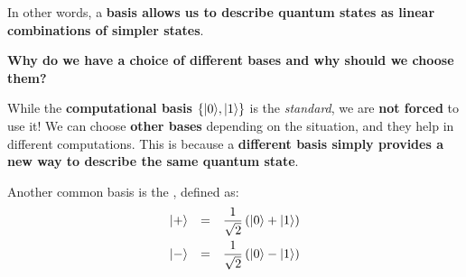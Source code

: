 \highspace
In other words, a \textbf{basis allows us to describe quantum states as linear combinations of simpler states}.

\highspace
\begin{flushleft}
    \textcolor{Green3}{ \textbf{Why do we have a choice of different bases and why should we choose them?}}
\end{flushleft}
While the \textbf{computational basis} $\left\{| 0 \rangle, | 1 \rangle\right\}$ is the \emph{standard}, we are \textbf{not forced} to use it! We can choose \textbf{other bases} depending on the situation, and they help in different computations. This is because a \textbf{different basis simply provides a new way to describe the same quantum state}.

\highspace
Another common basis is the , defined as:
\begin{equation*}
    \begin{array}{rcl}
        | + \rangle &=& \dfrac{1}{\sqrt{2}}\left(| 0 \rangle + | 1 \rangle\right) \\ [1em]
        | - \rangle &=& \dfrac{1}{\sqrt{2}}\left(| 0 \rangle - | 1 \rangle\right)
    \end{array}
\end{equation*}

